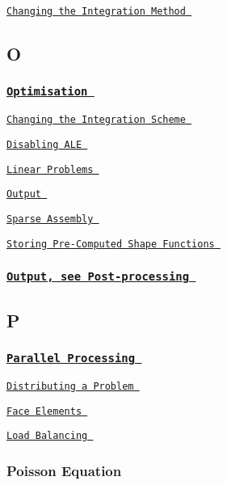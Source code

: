  
\begin{DoxyItemize}
\item  \href{ ../../optimisation/html/index.html#full_integration }{\tt Changing the Integration Method }  
\end{DoxyItemize}  \subsection*{ O }

 \subsubsection*{ \href{ ../../optimisation/html/index.html }{\tt Optimisation } }


\begin{DoxyItemize}
\item  \href{ ../../optimisation/html/index.html#full_integration }{\tt Changing the Integration Scheme }  
\item  \href{ ../../optimisation/html/index.html#ale }{\tt Disabling A\-L\-E }  
\item  \href{ ../../optimisation/html/index.html#linear_vs_nonlinear }{\tt Linear Problems }  
\item  \href{ ../../optimisation/html/index.html#C_style_output }{\tt Output }  
\item  \href{ ../../optimisation/html/index.html#assembly }{\tt Sparse Assembly }  
\item  \href{ ../../optimisation/html/index.html#store_shape }{\tt Storing Pre-\/\-Computed Shape Functions }  
\end{DoxyItemize}\subsubsection*{ \href{ ../../index/html/index.html#P.Post-processing }{\tt Output, see Post-\/processing } }

 \subsection*{ P }

 \subsubsection*{ \href{ ../../mpi/general_mpi/html/index.html }{\tt Parallel Processing } }


\begin{DoxyItemize}
\item  \href{ ../../mpi/adaptive_driven_cavity/html/index.html }{\tt Distributing a Problem }  
\item  \href{ ../../mpi/two_d_poisson_flux_bc_adapt/html/index.html }{\tt Face Elements }  
\item  \href{ ../../mpi/adaptive_driven_cavity_load_balance/html/index.html }{\tt Load Balancing }  
\end{DoxyItemize}\subsubsection*{ Poisson Equation }

